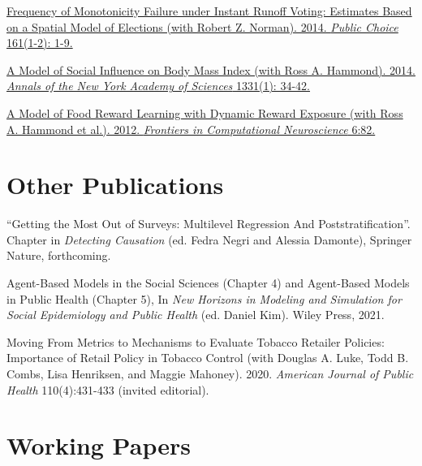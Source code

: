 \documentclass[margin,line]{res}
\newenvironment{publist}{
	\begin{list}{}{%
			\setlength{\itemsep}{0.15in}
			\setlength{\parsep}{0in} \setlength{\parskip}{0in}
			\setlength{\topsep}{0in} \setlength{\partopsep}{0in} 
			\setlength{\leftmargin}{0.15in}
			\setlength{\itemindent}{-0.15in}}}
		{\end{list}}
\begin{document}
\begin{resume}
\begin{publist}
	\item \href{https://joeornstein.github.io/publications/Ornstein-Norman-2014/Ornstein-Norman-2014.pdf}{Frequency of Monotonicity Failure under Instant Runoff Voting: Estimates Based on a Spatial Model of Elections (with Robert Z. Norman). 2014. \textit{Public Choice} 161(1-2): 1-9.}
	
	\item \href{https://joeornstein.github.io/publications/Hammond_et_al-2014-Annals_of_the_New_York_Academy_of_Sciences.pdf}{A Model of Social Influence on Body Mass Index (with Ross A. Hammond). 2014. \textit{Annals of the New York Academy of Sciences} 1331(1): 34-42.}
	
	\item \href{https://joeornstein.github.io/publications/Hammond-2012.pdf}{A Model of Food Reward Learning with Dynamic Reward Exposure (with Ross A. Hammond et al.). 2012. \textit{Frontiers in Computational Neuroscience} 6:82.}	
\end{publist}




\section{\sc Other Publications}

\begin{publist}
	\item ``Getting the Most Out of Surveys: Multilevel Regression And Poststratification''. Chapter in \textit{Detecting Causation} (ed. Fedra Negri and Alessia Damonte), Springer Nature, forthcoming.
	\item Agent-Based Models in the Social Sciences (Chapter 4) and Agent-Based Models in Public Health (Chapter 5), In \textit{New Horizons in Modeling and Simulation for Social Epidemiology and Public Health} (ed. Daniel Kim). Wiley Press, 2021. 
	\item Moving From Metrics to Mechanisms to Evaluate Tobacco Retailer Policies: Importance of Retail Policy in Tobacco Control (with Douglas A. Luke, Todd B. Combs, Lisa Henriksen, and Maggie Mahoney). 2020. \textit{American Journal of Public Health} 110(4):431-433 (invited editorial).
\end{publist}



\section{\sc Working Papers}


\end{resume}
\end{document}
